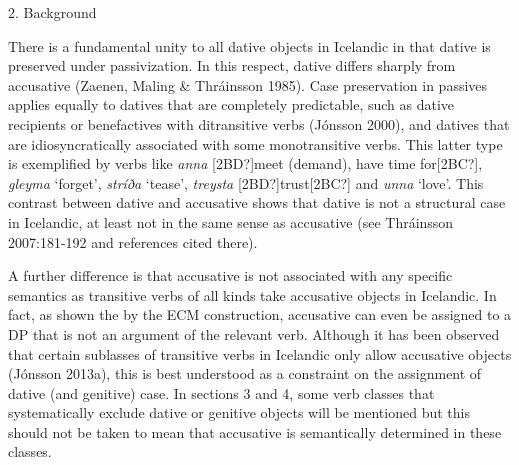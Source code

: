 \begin{stylelsSectioni}
2. Background
\end{stylelsSectioni}

\begin{styleStandard}
There is a fundamental unity to all dative objects in Icelandic in that dative is preserved under passivization. In this respect, dative differs sharply from accusative (Zaenen, Maling \& Thráinsson 1985). Case preservation in passives applies equally to datives that are completely predictable, such as dative recipients or benefactives with ditransitive verbs (Jónsson 2000), and datives that are idiosyncratically associated with some monotransitive verbs. This latter type is exemplified by verbs like \textit{anna} [2BD?]meet (demand), have time for[2BC?], \textit{gleyma} ‘forget’, \textit{stríða} ‘tease’,\textit{ treysta} [2BD?]trust[2BC?] and \textit{unna} ‘love’. This contrast between dative and accusative shows that dative is not a structural case in Icelandic, at least not in the same sense as accusative (see Thráinsson 2007:181-192 and references cited there).
\end{styleStandard}

\begin{styleStandard}
A further difference is that accusative is not associated with any specific semantics as transitive verbs of all kinds take accusative objects in Icelandic. In fact, as shown the by the ECM construction, accusative can even be assigned to a DP that is not an argument of the relevant verb. Although it has been observed that certain sublasses of transitive verbs in Icelandic only allow accusative objects (Jónsson 2013a), this is best understood as a constraint on the assignment of dative (and genitive) case. In sections 3 and 4, some verb classes that systematically exclude dative or genitive objects will be mentioned but this should not be taken to mean that accusative is semantically determined in these classes.
\end{styleStandard}

